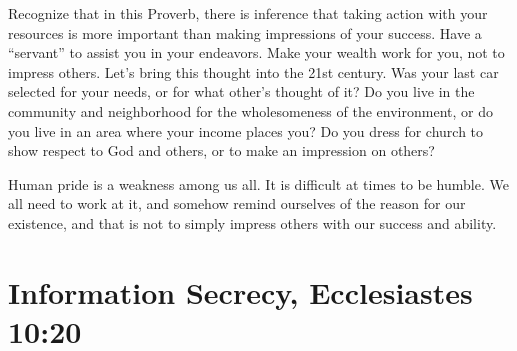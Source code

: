 \documentclass[12pt]{memoir}
\begin{document}
Recognize that in this Proverb, there is inference that taking action
with your resources is more important than making impressions of your
success. Have a ``servant'' to assist you in your endeavors. Make
your wealth work for you, not to impress others. Let's bring this
thought into the 21st century. Was your last car selected for your
needs, or for what other's thought of it? Do you live in the community
and neighborhood for the wholesomeness of the environment, or do you
live in an area where your income places you? Do you dress for church
to show respect to God and others, or to make an impression on others? 

Human pride is a weakness among us all. It is difficult at times to
be humble. We all need to work at it, and somehow remind ourselves
of the reason for our existence, and that is not to simply impress
others with our success and ability.

\section{Information Secrecy, Ecclesiastes 10:20}
\end{document}
